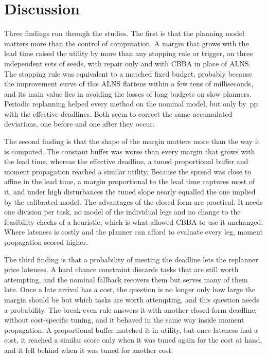 \section{Discussion}\label{sec:discussion}
Three findings run through the studies. The first is that the planning model matters more than the control of
computation. A margin that grows with the lead time raised the utility by more than any stopping rule or trigger, on
three independent sets of seeds, with repair only and with CBBA in place of ALNS. The stopping rule was equivalent to a
matched fixed budget, probably because the improvement curve of this ALNS flattens within a few tens of milliseconds,
and its main value lies in avoiding the losses of long budgets on slow planners. Periodic replanning helped every method
on the nominal model, but only by \,pp with the effective deadlines. Both seem to correct the same
accumulated deviations, one before and one after they occur.

The second finding is that the shape of the margin matters more than the way it is computed. The constant buffer was
worse than every margin that grows with the lead time, whereas the effective deadline, a tuned proportional buffer and
moment propagation reached a similar utility. Because the spread was close to affine in the lead time, a margin
proportional to the lead time captures most of it, and under high disturbances the tuned slope nearly equalled the one
implied by the calibrated model. The advantages of the closed form are practical. It needs one division per task, no
model of the individual legs and no change to the feasibility checks of a heuristic, which is what allowed CBBA to use
it unchanged. Where lateness is costly and the planner can afford to evaluate every leg, moment propagation scored
higher.

The third finding is that a probability of meeting the deadline lets the replanner price lateness. A hard chance
constraint discards tasks that are still worth attempting, and the nominal fallback recovers them but serves many of
them late. Once a late arrival has a cost, the question is no longer only how large the margin should be but which tasks
are worth attempting, and this question needs a probability. The break-even rule answers it with another closed-form
deadline, without cost-specific tuning, and it behaved in the same way inside moment propagation. A proportional buffer
matched it in utility, but once lateness had a cost, it reached a similar score only when it was tuned again for the
cost at hand, and it fell behind when it was tuned for another cost.

